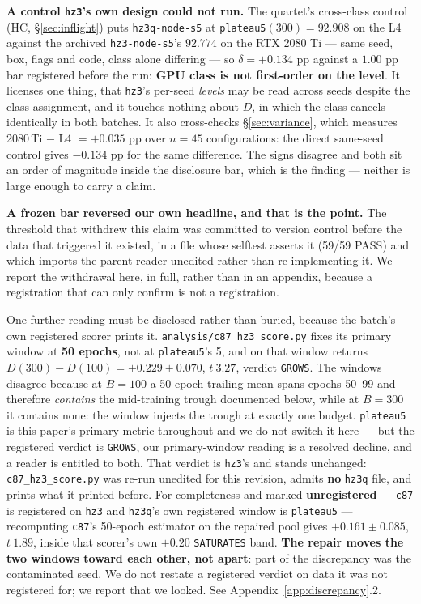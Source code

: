 \documentclass[10pt,letterpaper]{article}
\newcommand{\Dstat}{D}                         %
\newcommand{\plateau}{\texttt{plateau5}}
\newcommand{\arm}[1]{\texttt{#1}}
\begin{document}
\textbf{A control \arm{hz3}'s own design could not run.} The quartet's cross-class control (HC,
\S\ref{sec:inflight}) puts \arm{hz3q-node-s5} at \plateau{}$(300) = 92.908$ on the L4 against the
archived \arm{hz3-node-s5}'s $92.774$ on the RTX 2080 Ti --- same seed, box, flags and code, class
alone differing --- so $\delta = +0.134$ pp against a $1.00$ pp bar registered before the run:
\textbf{GPU class is not first-order on the level}. It licenses one thing, that \arm{hz3}'s
per-seed \emph{levels} may be read across seeds despite the class assignment, and it touches
nothing about $\Dstat$, in which the class cancels identically in both batches. It also
cross-checks \S\ref{sec:variance}, which measures 2080\,Ti $-$ L4 $= +0.035$ pp over $n = 45$
configurations: the direct same-seed control gives $-0.134$ pp for the same difference. The signs
disagree and both sit an order of magnitude inside the disclosure bar, which is the finding ---
neither is large enough to carry a claim.

\textbf{A frozen bar reversed our own headline, and that is the point.} The threshold that
withdrew this claim was committed to version control before the data that triggered it existed,
in a file whose selftest asserts it (59/59 PASS) and which imports the parent reader unedited
rather than re-implementing it. We report the withdrawal here, in full, rather than in an
appendix, because a registration that can only confirm is not a registration.

One further reading must be disclosed rather than buried, because the batch's own registered
scorer prints it. \texttt{analysis/c87\_hz3\_score.py} fixes its primary window at
\textbf{50 epochs}, not at \plateau{}'s 5, and on that window returns
$\Dstat(300) - \Dstat(100) = \mathbf{+0.229 \pm 0.070}$, $t\ 3.27$, verdict \texttt{GROWS}. The
windows disagree because at $B = 100$ a 50-epoch trailing mean spans epochs 50--99 and therefore
\emph{contains} the mid-training trough documented below, while at $B = 300$ it contains none:
the window injects the trough at exactly one budget. \plateau{} is this paper's primary metric
throughout and we do not switch it here --- but the registered verdict is \texttt{GROWS}, our
primary-window reading is a resolved decline, and a reader is entitled to both. That verdict is
\arm{hz3}'s and stands unchanged: \texttt{c87\_hz3\_score.py} was re-run unedited for this
revision, admits \textbf{no} \arm{hz3q} file, and prints what it printed before. For completeness
and marked \textbf{unregistered} --- \texttt{c87} is registered on \arm{hz3} and \arm{hz3q}'s own
registered window is \plateau{} --- recomputing \texttt{c87}'s 50-epoch estimator on the repaired
pool gives $+0.161 \pm 0.085$, $t\ 1.89$, inside that scorer's own $\pm 0.20$ \texttt{SATURATES}
band. \textbf{The repair moves the two windows toward each other, not apart}: part of the
discrepancy was the contaminated seed. We do not restate a registered verdict on data it was not
registered for; we report that we looked. See Appendix~\ref{app:discrepancy}.2.
\end{document}
